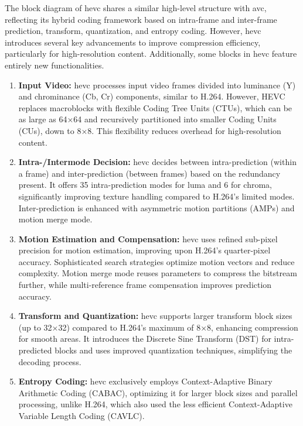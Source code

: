     The block diagram of \gls{hevc} shares a similar high-level structure with \gls{avc}, reflecting its hybrid coding framework based on intra-frame and inter-frame prediction, transform, quantization, and entropy coding. However, \gls{hevc} introduces several key advancements to improve compression efficiency, particularly for high-resolution content. Additionally, some blocks in \gls{hevc} feature entirely new functionalities.

    \begin{enumerate}[label=\textbf{\roman*.}]
        \item \textbf{Input Video:}  
        \gls{hevc} processes input video frames divided into luminance (Y) and chrominance (Cb, Cr) components, similar to H.264. However, HEVC replaces macroblocks with flexible Coding Tree Units (CTUs), which can be as large as 64×64 and recursively partitioned into smaller Coding Units (CUs), down to 8×8. This flexibility reduces overhead for high-resolution content.
    
        \item \textbf{Intra-/Intermode Decision:}  
        \gls{hevc} decides between intra-prediction (within a frame) and inter-prediction (between frames) based on the redundancy present. It offers 35 intra-prediction modes for luma and 6 for chroma, significantly improving texture handling compared to H.264's limited modes. Inter-prediction is enhanced with asymmetric motion partitions (AMPs) and motion merge mode.
    
        \item \textbf{Motion Estimation and Compensation:}  
        \gls{hevc} uses refined sub-pixel precision for motion estimation, improving upon H.264's quarter-pixel accuracy. Sophisticated search strategies optimize motion vectors and reduce complexity. Motion merge mode reuses parameters to compress the bitstream further, while multi-reference frame compensation improves prediction accuracy.
    
        \item \textbf{Transform and Quantization:}  
        \gls{hevc} supports larger transform block sizes (up to 32×32) compared to H.264's maximum of 8×8, enhancing compression for smooth areas. It introduces the Discrete Sine Transform (DST) for intra-predicted blocks and uses improved quantization techniques, simplifying the decoding process.
    
        \item \textbf{Entropy Coding:}  
        \gls{hevc} exclusively employs Context-Adaptive Binary Arithmetic Coding (CABAC), optimizing it for larger block sizes and parallel processing, unlike H.264, which also used the less efficient Context-Adaptive Variable Length Coding (CAVLC).
    

\end{enumerate}
